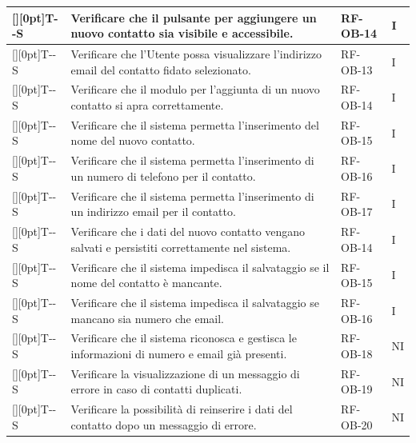 \documentclass[a4paper,12pt]{article}
\newcounter{testsys}
\newcommand{\systestcode}{%
  \raisebox{0pt}[\height][0pt]{\hypertarget{T-\arabic{testsys}-S}{}}T-\arabic{testsys}-S%
}
\begin{document}
\begin{longtable}{| >{\centering\arraybackslash}p{} | >{\raggedright\arraybackslash}p{} | >{\centering\arraybackslash}p{} | >{\centering\arraybackslash}p{} |}
\stepcounter{testsys} \systestcode & Verificare che il pulsante per aggiungere un nuovo contatto sia visibile e accessibile. & RF-OB-14 & I \\
\hline

\stepcounter{testsys} \systestcode & Verificare che l'Utente possa visualizzare l'indirizzo email del contatto fidato selezionato. & RF-OB-13 & I \\
\hline

\stepcounter{testsys} \systestcode & Verificare che il modulo per l'aggiunta di un nuovo contatto si apra correttamente. & RF-OB-14 & I \\
\hline

\stepcounter{testsys} \systestcode & Verificare che il sistema permetta l'inserimento del nome del nuovo contatto. & RF-OB-15 & I \\
\hline

\stepcounter{testsys} \systestcode & Verificare che il sistema permetta l'inserimento di un numero di telefono per il contatto. & RF-OB-16 & I \\
\hline

\stepcounter{testsys} \systestcode & Verificare che il sistema permetta l'inserimento di un indirizzo email per il contatto. & RF-OB-17 & I \\
\hline

\stepcounter{testsys} \systestcode & Verificare che i dati del nuovo contatto vengano salvati e persistiti correttamente nel sistema. & RF-OB-14 & I \\
\hline

\stepcounter{testsys} \systestcode & Verificare che il sistema impedisca il salvataggio se il nome del contatto è mancante. & RF-OB-15 & I \\
\hline

\stepcounter{testsys} \systestcode & Verificare che il sistema impedisca il salvataggio se mancano sia numero che email. & RF-OB-16 & I \\
\hline

\stepcounter{testsys} \systestcode & Verificare che il sistema riconosca e gestisca le informazioni di numero e email già presenti. & RF-OB-18 & NI \\
\hline

\stepcounter{testsys} \systestcode & Verificare la visualizzazione di un messaggio di errore in caso di contatti duplicati. & RF-OB-19 & NI \\
\hline

\stepcounter{testsys} \systestcode & Verificare la possibilità di reinserire i dati del contatto dopo un messaggio di errore. & RF-OB-20 & NI \\
\hline


\end{longtable}
\end{document}
